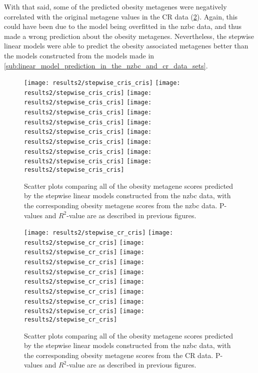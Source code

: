 With that said, some of the predicted obesity metagenes were negatively correlated with the original metagene values in the CR data (\cref{fig:stepwise_cr}).
Again, this could have been due to the model being overfitted in the \gls{nzbc} data, and thus made a wrong prediction about the obesity metagenes.
Nevertheless, the stepwise linear models were able to predict the obesity associated metagenes better than the models constructed from the models made in \cref{sub:linear_model_prediction_in_the_nzbc_and_cr_data_sets}.

\begin{figure}[htpb]
	\centering
	\texttt{[image: results2/stepwise\_cris\_cris]}
	\texttt{[image: results2/stepwise\_cris\_cris]}
	\texttt{[image: results2/stepwise\_cris\_cris]}
	\texttt{[image: results2/stepwise\_cris\_cris]}
	\texttt{[image: results2/stepwise\_cris\_cris]}
	\texttt{[image: results2/stepwise\_cris\_cris]}
	\texttt{[image: results2/stepwise\_cris\_cris]}
	\texttt{[image: results2/stepwise\_cris\_cris]}
	\texttt{[image: results2/stepwise\_cris\_cris]}
	\texttt{[image: results2/stepwise\_cris\_cris]}
	\caption[Comparison of all the obesity metagene scores predicted from the stepwise linear models with the obesity metagene scores from the \gls{nzbc} data]{Scatter plots comparing all of the obesity metagene scores predicted by the stepwise linear models constructed from the \gls{nzbc} data, with the corresponding obesity metagene scores from the \gls{nzbc} data.
	P-values and $R^2$-value are as described in previous figures.}
	\label{fig:stepwise_cris}
\end{figure}

\begin{figure}[htpb]
	\centering
	\texttt{[image: results2/stepwise\_cr\_cris]}
	\texttt{[image: results2/stepwise\_cr\_cris]}
	\texttt{[image: results2/stepwise\_cr\_cris]}
	\texttt{[image: results2/stepwise\_cr\_cris]}
	\texttt{[image: results2/stepwise\_cr\_cris]}
	\texttt{[image: results2/stepwise\_cr\_cris]}
	\texttt{[image: results2/stepwise\_cr\_cris]}
	\texttt{[image: results2/stepwise\_cr\_cris]}
	\texttt{[image: results2/stepwise\_cr\_cris]}
	\texttt{[image: results2/stepwise\_cr\_cris]}
	\caption[Comparison of all the obesity metagene scores predicted from the stepwise linear models with the obesity metagene scores from the CR data]{Scatter plots comparing all of the obesity metagene scores predicted by the stepwise linear models constructed from the \gls{nzbc} data, with the corresponding obesity metagene scores from the CR data.
	P-values and $R^2$-value are as described in previous figures.}
	\label{fig:stepwise_cr}
\end{figure}

